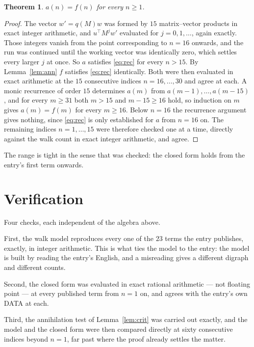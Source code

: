 \documentclass[11pt,a4paper]{article}
\theoremstyle{plain}
\newtheorem{theorem}{Theorem}
\theoremstyle{definition}
\begin{document}
\begin{theorem}
$a(n)=f(n)$ for every $n\ge1$.
\end{theorem}

\begin{proof}
The vector $w'=q(M)w$ was formed by $15$ matrix--vector products in exact integer
arithmetic, and $u^{\!\top}M^{j}w'$ evaluated for $j=0,1,\dots$, again exactly. Those integers
vanish from the point corresponding to $n=16$ onwards, and the run was continued until the
working vector was identically zero, which settles every larger $j$ at once. So $a$ satisfies
\eqref{eq:rec} for every $n>15$. By Lemma~\ref{lem:ann} $f$ satisfies \eqref{eq:rec}
identically. Both were then evaluated in exact arithmetic at the $15$ consecutive indices
$n=16,\dots,30$ and agree at each. A monic recurrence of order $15$
determines $a(m)$ from $a(m-1),\dots,a(m-15)$, and for every $m\ge31$ both
$m>15$ and $m-15\ge16$ hold, so induction on $m$ gives $a(m)=f(m)$ for every
$m\ge16$.
Below $n=16$ the recurrence argument gives nothing, since \eqref{eq:rec} is only
established for $a$ from $n=16$ on. The remaining indices $n=1,\dots,15$ were
therefore checked one at a time, directly against the walk count in exact integer arithmetic,
and agree.
\end{proof}

The range is tight in the sense that was checked: the closed form holds from the entry's first term onwards.

\section{Verification}

Four checks, each independent of the algebra above.

First, the walk model reproduces every one of the $23$ terms the entry publishes,
exactly, in integer arithmetic. This is what ties the model to the entry: the model is built
by reading the entry's English, and a misreading gives a different digraph and different
counts.

Second, the closed form was evaluated in exact rational arithmetic --- not floating point ---
at every published term from $n=1$ on, and agrees with the entry's own DATA at each.

Third, the annihilation test of Lemma~\ref{lem:crit} was carried out exactly, and the model
and the closed form were then compared directly at sixty consecutive indices beyond
$n=1$, far past where the proof already settles the matter.
\end{document}
